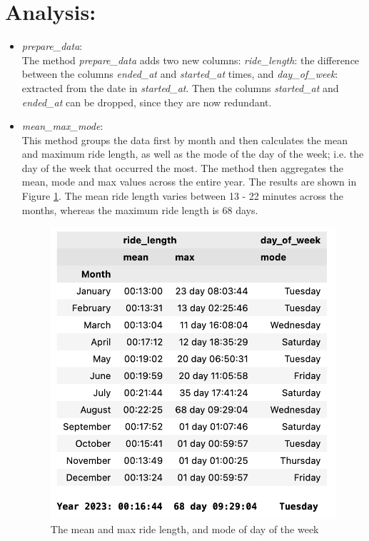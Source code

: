 \documentclass[12pt]{article}
\begin{document}
\section*{Analysis:}
\begin{itemize}
\item \textit{prepare\_data}:\\
	The method \textit{prepare\_data} adds two new columns: \textit{ride\_length}: the difference between the columns \textit{ended\_at} and \textit{started\_at} times, and \textit{day\_of\_week}: extracted from the date in \textit{started\_at}. Then the columns \textit{started\_at} and \textit{ended\_at} can be dropped, since they are now redundant.
	
\item \textit{mean\_max\_mode}:\\	
	This method groups the data first by month and then calculates the mean and maximum ride length, as well as the mode of the day of the week; i.e. the day of the week that occurred the most. The method then aggregates the mean, mode and max values across the entire year. The results are shown in Figure \ref{fig9}. The mean ride length varies between 13 - 22 minutes across the months, whereas the maximum ride length is 68 days. 
	
	\begin{figure}[h]
	\centering
	\includegraphics[scale=0.7]{imgMeanMax1.png} 
	\caption{The mean and max ride length, and mode of day of the week}
	\label{fig9}
	\end{figure}
	

\end{itemize}
\end{document}

